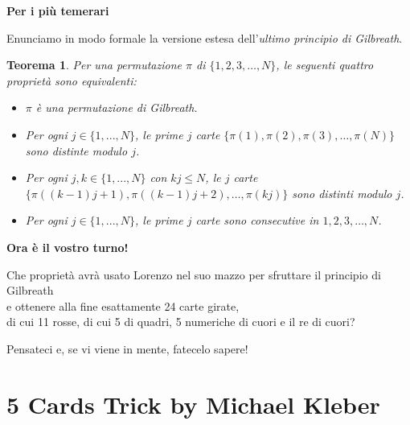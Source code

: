 \documentclass[8pt]{beamer}
\theoremstyle{plain}
\newtheorem{thm}{Teorema}[section]
\theoremstyle{definition}
\begin{document}
\begin{frame}
\begin{center}
\textbf{Per i più temerari}

\bigskip

Enunciamo in modo formale la versione estesa dell'\textit{ultimo principio di Gilbreath}.

\medskip

\begin{thm}
Per una permutazione $\pi$ di $\{1, 2, 3, \ldots , N \}$, le seguenti quattro proprietà sono equivalenti:



\begin{itemize}
\item $\pi$ è una permutazione di Gilbreath.
\item Per ogni $j\in\{1,...,N\}$, le prime $j$ carte $\{\pi(1), \pi(2), \pi(3), \ldots , \pi(N)\}$ sono distinte modulo $j$.
\item Per ogni $j,k\in\{1,...,N\}$ con $kj \leq N$, le $j$ carte $\{\pi((k-1)j + 1), \pi((k-1)j +2), \ldots , \pi(kj)\}$ sono distinti modulo $j$.
\item Per ogni $j\in\{1,...,N\}$, le prime $j$ carte sono consecutive in $1, 2, 3, \ldots , N$.
\end{itemize}
\end{thm}
\end{center}
\end{frame}

\begin{frame}
\begin{center}
\textbf{Ora è il vostro turno!}

\bigskip

Che proprietà avrà usato Lorenzo nel suo mazzo per sfruttare il principio di Gilbreath \\ e ottenere alla fine esattamente 24 carte girate, \\ di cui 11 rosse, di cui 5 di quadri, 5 numeriche di cuori e il re di cuori?

\medskip
\medskip

Pensateci e, se vi viene in mente, fatecelo sapere!
\end{center}
\end{frame}




\section{5 Cards Trick by Michael Kleber}
\end{document}
